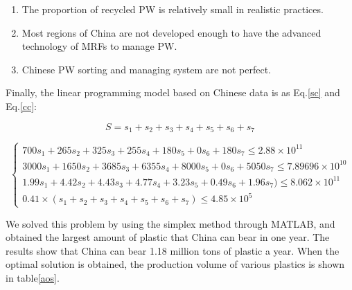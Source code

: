 \documentclass{mcmthesis}
\begin{document}
\begin{enumerate}
	\item The proportion of recycled PW is relatively small in realistic practices. 
	\item Most regions of China are not developed enough to have the advanced technology of MRFs to manage PW.
	\item Chinese PW sorting and managing system are not perfect.
\end{enumerate}

Finally, the linear programming model based on Chinese data is as Eq.\ref{sc} and Eq.\ref{cc}:

\begin{equation}
	S = s_1 + s_2 + s_3 + s_4 + s_5 + s_6 + s_7
	\label{sc}
\end{equation}

\begin{equation}
\label{cc}
\left\{
\begin{aligned}
700s_1+265s_2+325s_3+255s_4+180s_5+0s_6+180s_7\le 2.88\times 10^{11}\\
3000s_1+1650s_2+3685s_3+6355s_4+8000s_5+0s_6+5050s_7\le7.89696\times 10^{10}\\
1.99s_1+4.42s_2+4.43s_3+4.77s_4+3.23s_5+0.49s_6+1.96s_7)\le 8.062\times 10^{11}\\
0.41\times(s_1+s_2+s_3+s_4+s_5+s_6+s_7)\le 4.85\times 10^5
\end{aligned}
\right.
\end{equation}



We solved this problem by using the simplex method through MATLAB, and obtained the largest amount of plastic that China can bear in one year. The results show that China can bear 1.18 million tons of plastic a year. When the optimal solution is obtained, the production volume of various plastics is shown in table\ref{aos}.
\end{document}
